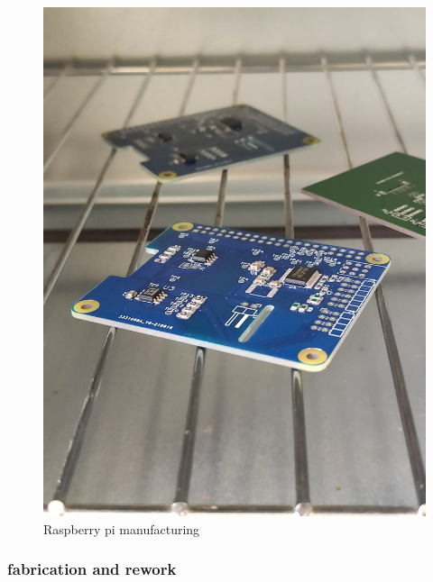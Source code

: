 \begin{figure}[h]
	\centering
	\includegraphics[width=\linewidth]{../art/pcb Manufactureing.jpeg}
	\caption{Raspberry pi manufacturing}
\end{figure}


\subsubsection{fabrication and rework}